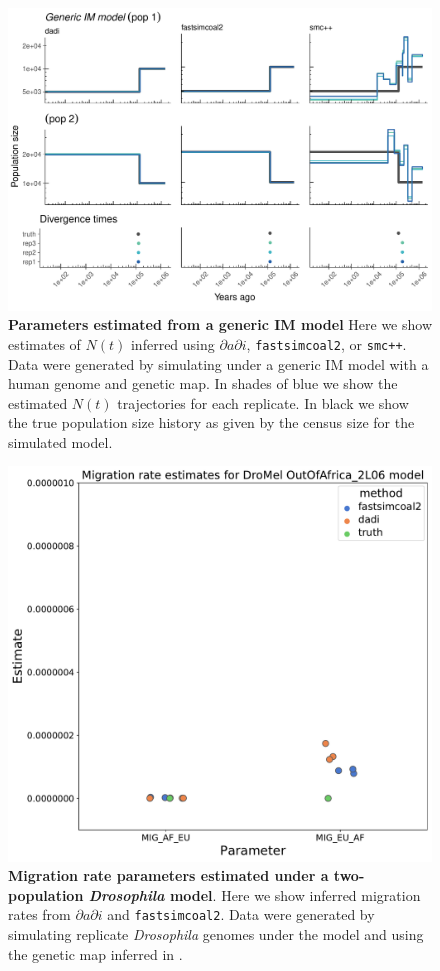 \documentclass[12pt,halfline,a4paper]{ouparticle}
\newcommand{\dadi}{$\partial a \partial i$\xspace}
\newcommand{\smcpp}{\texttt{smc++}\xspace}
\newcommand{\fastsimcoal}{\texttt{fastsimcoal2}\xspace}
\begin{document}
\begin{figure}
\begin{center}
\includegraphics[width=0.8\linewidth]{display_items/generic_IM.pdf}
\caption{\textbf{Parameters estimated from a generic IM model} Here we show estimates of $N(t)$
inferred using \dadi, \texttt{fastsimcoal2}, or \smcpp. Data were generated by simulating
under a generic IM model with a human genome and \cite{international2007second} genetic map.
In shades of blue we show the estimated
$N(t)$ trajectories for each replicate. In black we show the true population size history
as given by the census size for the simulated model.}
\label{fig:generic_IM}
\end{center}
\end{figure}


\begin{figure}
\begin{center}
\includegraphics[width=0.8\linewidth]{display_items/dromel_migration_rates.pdf}
\caption{\textbf{Migration rate parameters estimated under a two-population \emph{Drosophila} model}.
Here we show inferred migration rates from \dadi and \fastsimcoal.
Data were generated by simulating replicate \emph{Drosophila} genomes under the \cite{li2006inferring} model and using the genetic map
inferred in \cite{comeron2012many}.}
\label{fig:dromel_mig_rates}
\end{center}
\end{figure}
\end{document}
